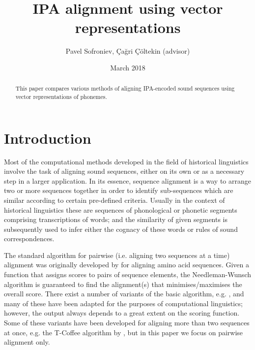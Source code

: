 \documentclass[a4paper]{report}
\begin{document}
\title{IPA alignment using vector representations}
\author{Pavel Sofroniev, Çağri Çöltekin (advisor)}
\date{March 2018}
\maketitle

\begin{abstract}
	This paper compares various methods of aligning IPA-encoded sound sequences using vector representations of phonemes.
\end{abstract}


\chapter{Introduction}

Most of the computational methods developed in the field of historical linguistics involve the task of aligning sound sequences,
either on its own or as a necessary step in a larger application.
In its essence, sequence alignment is a way to arrange two or more sequences together
in order to identify sub-sequences which are similar according to certain pre-defined criteria.
Usually in the context of historical linguistics these are sequences of phonological or phonetic segments comprising transcriptions of words;
and the similarity of given segments is subsequently used to infer either the cognacy of these words or rules of sound correspondences.

The standard algorithm for pairwise (i.e. aligning two sequences at a time) alignment
was originally developed by \citet{1970_Needleman_Wunsch} for aligning amino acid sequences.
Given a function that assigns scores to pairs of sequence elements,
the Needleman-Wunsch algorithm is guaranteed to find the alignment(s) that minimises/maximises the overall score.
There exist a number of variants of the basic algorithm, e.g. \citet{1981_Smith_Waterman},
and many of these have been adapted for the purposes of computational linguistics;
however, the output always depends to a great extent on the scoring function.
Some of these variants have been developed for aligning more than two sequences at once,
e.g. the T-Coffee algorithm by \citet{2000_Notredame_al}, but in this paper we focus on pairwise alignment only.
\end{document}
